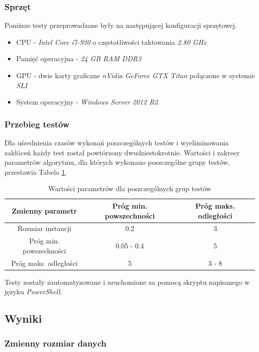 \documentclass[12pt]{article}
\begin{document}
\subsubsection{Sprzęt}

Poniższe testy przeprowadzane były na następującej konfiguracji sprzętowej.

\begin{itemize}
\item CPU - \textit{Intel Core i7-930} o częstotliwości taktowania \textit{2.80 GHz}
\item Pamięć operacyjna - \textit{24 GB RAM DDR3}
\item GPU - dwie karty graficzne \textit{nVidia GeForce GTX Titan} połączone w systemie \textit{SLI}
\item System operacyjny - \textit{Windows Server 2012 R2}
\end{itemize}

\subsubsection{Przebieg testów}

Dla uśrednienia czasów wykonań poszczególnych testów i wyeliminowania zakłóceń każdy test został powtórzony dwudziestokrotnie. Wartości i zakresy parametrów algorytmu, dla których wykonano poszczególne grupy testów, przestawia Tabela \ref{tab:params}.

\begin{table}[h!]
\centering
\begin{tabular}{|c|c|c|}
\hline
\textbf{Zmienny parametr} & \textbf{Próg min. powszechności} & \textbf{Próg maks. odległości} \\
\hline
Rozmiar instancji & 0.2 & 3 \\
Próg min. powszechności & 0.05 - 0.4 & 5 \\
Próg maks. odległości & 5 & 3 - 8 \\
\hline
\end{tabular}
\caption{Wartości parametrów dla poszczególnych grup testów}
\label{tab:params}
\end{table}

Testy zostały zautomatyzowane i uruchomione za pomocą skryptu napisanego w języku \textit{PowerShell}.

\subsection{Wyniki}

\subsubsection{Zmienny rozmiar danych}
\end{document}
